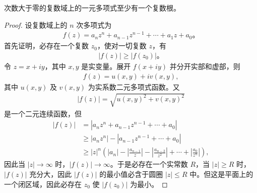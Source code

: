 \documentclass[lang=cn,newtx,10pt,scheme=chinese]{elegantbook}
\begin{document}
\begin{theorem}[代数基本定理]\label{theorem:代数基本定理}
次数大于零的复数域上的一元多项式至少有一个复数根。
\end{theorem}
\begin{proof}
设复数域上的 $n$ 次多项式为
\begin{align}
f(z) = a_n z^n + a_{n-1} z^{n-1} + \cdots + a_1 z + a_0。 \label{theorem5.14-5.6.1}
\end{align}
首先证明，必存在一个复数 $z_0$，使对一切复数 $z$，有
\begin{align*}
|f(z)| \geq |f(z_0)|。
\end{align*}
令 $z = x + iy$，其中 $x, y$ 是实变量。展开 $f(x + iy)$ 并分开实部和虚部，则
\begin{align*}
f(z) = u(x, y) + iv(x, y),
\end{align*}
其中 $u(x, y)$ 及 $v(x, y)$ 为实系数二元多项式函数。又
\begin{align*}
|f(z)| = \sqrt{u(x, y)^2 + v(x, y)^2}
\end{align*}
是一个二元连续函数，但
\begin{align*}
|f(z)| &= |a_n z^n + a_{n-1} z^{n-1} + \cdots + a_0| \\
&\geq |a_n z^n| - |a_{n-1} z^{n-1} + \cdots + a_0| \\
&\geq |z|^n \left( |a_n| - \left| \frac{a_{n-1}}{z} \right| - \left| \frac{a_{n-2}}{z^2} \right| + \cdots + \left| \frac{a_0}{z^n} \right| \right),
\end{align*}
因此当 $|z| \to \infty$ 时，$|f(z)| \to \infty$。于是必存在一个实常数 $R$，当 $|z| \geq R$ 时，$|f(z)|$ 充分大，因此 $|f(z)|$ 的最小值必含于圆圈 $|z| \leq R$ 中。但这是平面上的一个闭区域，因此必存在 $z_0$ 使 $|f(z_0)|$ 为最小。


\end{proof}
\end{document}
